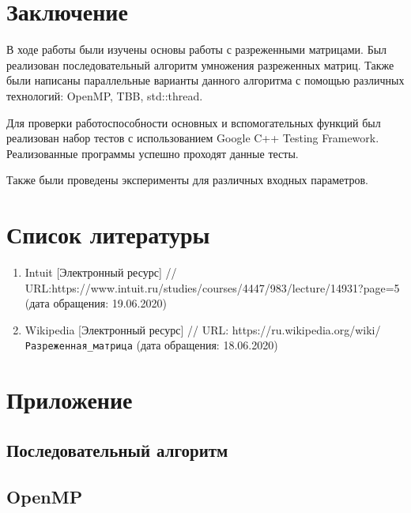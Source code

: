 \documentclass{report}
\begin{document}
\section*{Заключение}
В ходе работы были изучены основы работы с разреженными матрицами. Был реализован последовательный алгоритм умножения разреженных матриц. Также были написаны параллельные варианты данного алгоритма с помощью различных технологий: OpenMP, TBB, std::thread.
\par Для проверки работоспособности основных и вспомогательных функций был реализован набор тестов с использованием Google C++ Testing Framework. Реализованные программы успешно проходят данные тесты.
\par Также были проведены эксперименты для различных входных параметров.
\newpage



\section*{Список литературы}
\begin {enumerate}
\item Intuit [Электронный ресурс] // URL:https://www.intuit.ru/studies/courses/4447/983/lecture/14931?page=5 (дата обращения: 19.06.2020)
\item Wikipedia [Электронный ресурс] // URL: https://ru.wikipedia.org/wiki/\verb|Разреженная_матрица| (дата обращения: 18.06.2020)

\end{enumerate}
\newpage


\section*{Приложение}
\subsection*{Последовательный алгоритм}




\subsection*{OpenMP}



\end{document}
